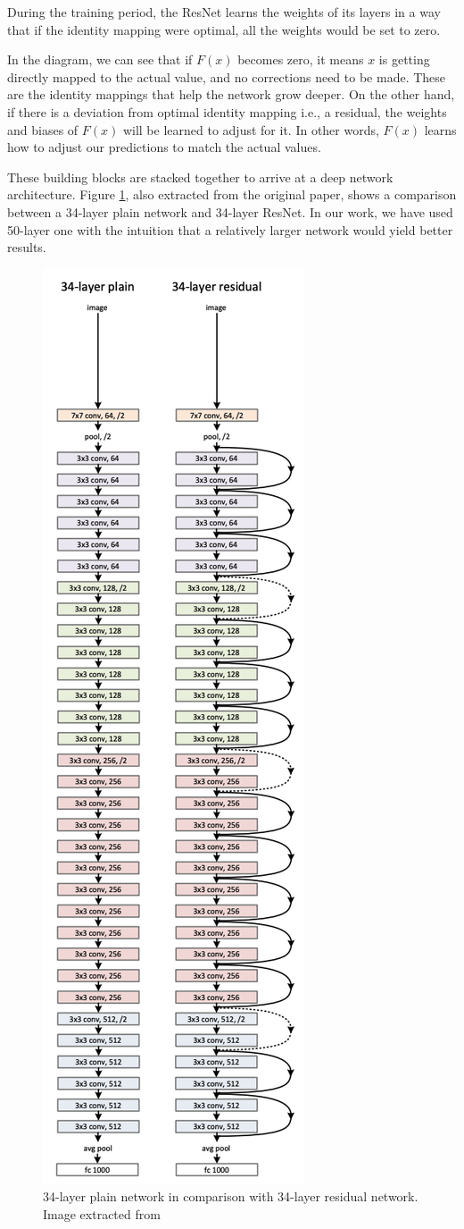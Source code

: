 During the training period, the ResNet learns the weights of its layers in a way that if the identity mapping were optimal, all the weights would be set to zero.

In the diagram, we can see that if $F(x)$ becomes zero, it means $x$ is getting directly mapped to the actual value, and no corrections need to be made. These are the identity mappings that help the network grow deeper. On the other hand, if there is a deviation from optimal identity mapping i.e., a residual, the weights and biases of $F(x)$ will be learned to adjust for it. In other words, $F(x)$ learns how to adjust our predictions to match the actual values.

These building blocks are stacked together to arrive at a deep network architecture. Figure \ref{fig:resnet}, also extracted from the original paper, shows a comparison between a 34-layer plain network and 34-layer ResNet. In our work, we have used 50-layer one with the intuition that a relatively larger network would yield better results.

\begin{figure}[h!tp]
    \centering
    \includegraphics[width=.4\textwidth]{imgs/chap5_resnet.png}
    \caption[34-layer plain network in comparison with 34-layer residual network.]{34-layer plain network in comparison with 34-layer residual network. Image extracted from \cite{ParkhiVZ15}}
    \label{fig:resnet}
\end{figure}

